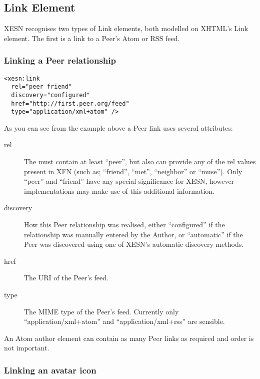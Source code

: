 \documentclass[titlepage,english,a4paper,twoside,dvips]{article}
\begin{document}
\subsection{Link Element}

XESN recognises two types of Link elements, both modelled on XHTML's Link element.  The first is a link to a Peer's Atom or RSS feed.

\subsubsection{Linking a Peer relationship}

\begin{verbatim}
<xesn:link 
  rel="peer friend" 
  discovery="configured" 
  href="http://first.peer.org/feed" 
  type="application/xml+atom" />
\end{verbatim}

As you can see from the example above a Peer link uses several attributes:

\begin{description}

\item[rel] The must contain at least ``peer'', but also can provide any of the rel values present in XFN (such as; ``friend'', ``met'', ``neighbor'' or ``muse'').  Only ``peer'' and ``friend'' have any special significance for XESN, however implementations may make use of this additional information.

\item[discovery] How this Peer relationship was realised, either ``configured'' if the relationship was manually entered by the Author, or ``automatic'' if the Peer was discovered using one of XESN's automatic discovery methods. 

\item[href] The URI of the Peer's feed.

\item[type] The MIME type of the Peer's feed.  Currently only ``application/xml+atom'' and ``application/xml+rss'' are sensible.

\end{description}

An Atom author element can contain as many Peer links as required and order is not important.

\subsubsection{Linking an avatar icon}
\end{document}
